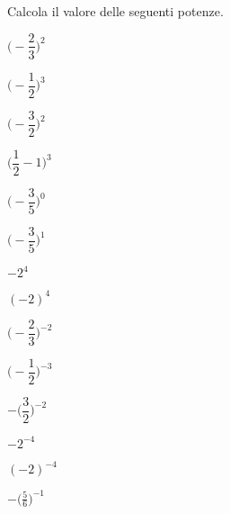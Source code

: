\subsubsection*{}

\begin{esercizio}
 \label{ese:3.56}
Calcola il valore delle seguenti potenze.
\begin{multicols}{4}
\begin{enumeratea}
\spazielenx
 \item $\bigg(-\dfrac{2}{3}\bigg)^2$
 \item $\bigg(-\dfrac{1}{2}\bigg)^3$
 \item $\bigg(-\dfrac{3}{2}\bigg)^2$
 \item $\bigg(\dfrac{1}{2}-1\bigg)^3$
 \item $\bigg(-\dfrac{3}{5}\bigg)^0$
 \item $\bigg(-\dfrac{3}{5}\bigg)^1$
 \item $-2^4$
 \item $(-2)^4$
 \item $\bigg(-\dfrac{2}{3}\bigg)^{-2}$
 \item $\bigg(-\dfrac{1}{2}\bigg)^{-3}$
 \item $-\bigg(\dfrac{3}{2}\bigg)^{-2}$
 \item $-2^{-4}$
 \item $(-2)^{-4}$
 \item $-\bigg(\frac{5}{6}\bigg)^{-1}$
\end{enumeratea}
\end{multicols}
\end{esercizio}


